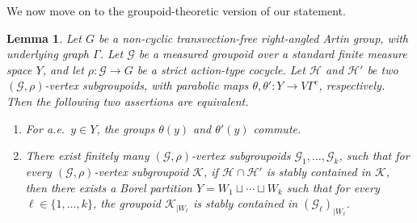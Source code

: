 \documentclass[JEP,XML,SOM,Unicode,NoFloatCountersInSection,published]{cedram}
\let\mathcal\mathscr
\theoremstyle{plain}
\newtheorem{lemma}[theo]{Lemma}
\theoremstyle{definition}
\let\dunion\sqcup
\newcommand{\calg}{\mathcal{G}}
\newcommand{\calh}{\mathcal{H}}
\newcommand{\calk}{\mathcal{K}}
\begin{document}
We now move on to the groupoid-theoretic version of our statement.

\begin{lemma}\label{lemma:adjacency-groupoids}
Let $G$ be a non-cyclic transvection-free right-angled Artin group, with underlying graph $\Gamma$. Let $\calg$ be a measured groupoid over a standard finite measure space $Y$, and let $\rho:\calg\to G$ be a strict action-type cocycle. Let $\calh$ and $\calh'$ be two $(\calg,\rho)$-vertex subgroupoids, with parabolic maps $\theta,\theta':Y\to V\Gamma^e$, respectively. Then the following two assertions are equivalent.
\begin{enumerate}
\item\label{lemma:adjacency-groupoids1} For a.e.\ $y\in Y$, the groups $\theta(y)$ and $\theta'(y)$ commute.
\item\label{lemma:adjacency-groupoids2} There exist finitely many $(\calg,\rho)$-vertex subgroupoids $\calg_1,\dots,\calg_k$, such that for every $(\calg,\rho)$-vertex subgroupoid $\calk$, if $\calh\cap\calh'$ is stably contained in $\calk$, then there exists a Borel partition $Y=W_1\dunion \cdots\dunion W_k$ such that for every $\ell\in\{1,\dots,k\}$, the groupoid $\calk_{|W_\ell}$ is stably contained in $(\calg_\ell)_{|W_\ell}$.
\end{enumerate}
\end{lemma}
\end{document}
